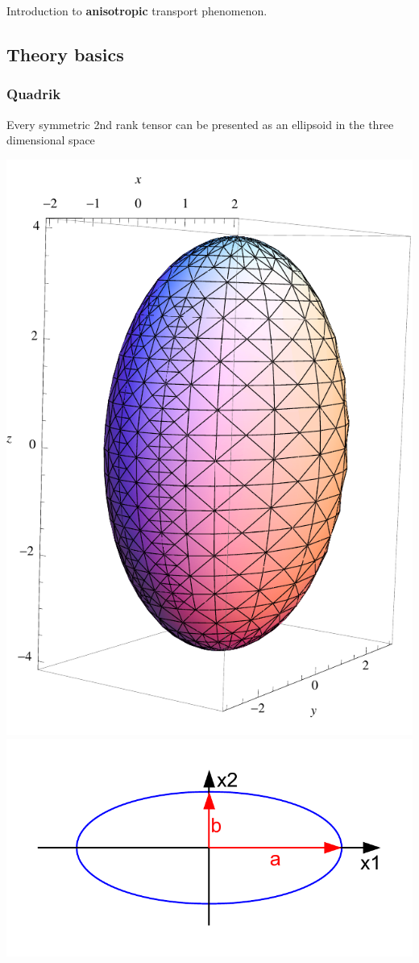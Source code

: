 Introduction to \textbf{anisotropic} transport phenomenon.
\subsection{Theory basics}
\subsubsection{Quadrik}
 Every symmetric 2nd rank tensor can be presented as an ellipsoid in the three dimensional space
 
\begin{multicols}{3}
		\includegraphics[scale=0.2]{images/ellipsoid.pdf}
	\columnbreak	
		\includegraphics[scale=0.4]{images/quadrik_2d_ellipse.pdf}

\end{multicols}
